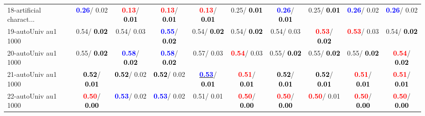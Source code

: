 \begin{table}[h]
\begin{center}
{\begin{tabular}{lc|c|c|c|c|c|c|c|c}
18-artificial charact... & \textcolor{blue}{\textbf{  0.26}}/  0.02 & \textcolor{red}{\textbf{  0.13}}/\textcolor{black}{\textbf{  0.01}} & \textcolor{red}{\textbf{  0.13}}/\textcolor{black}{\textbf{  0.01}} & \textcolor{red}{\textbf{  0.13}}/\textcolor{black}{\textbf{  0.01}} &   0.25/\textcolor{black}{\textbf{  0.01}} & \textcolor{blue}{\textbf{  0.26}}/\textcolor{black}{\textbf{  0.01}} &   0.25/\textcolor{black}{\textbf{  0.01}} & \textcolor{blue}{\textbf{  0.26}}/  0.02 & \textcolor{blue}{\textbf{  0.26}}/  0.02 \\
19-autoUniv au1 1000 &   0.54/\textcolor{black}{\textbf{  0.02}} &   0.54/  0.03 & \textcolor{blue}{\textbf{  0.55}}/\textcolor{black}{\textbf{  0.02}} &   0.54/\textcolor{black}{\textbf{  0.02}} &   0.54/\textcolor{black}{\textbf{  0.02}} &   0.54/  0.03 & \textcolor{red}{\textbf{  0.53}}/\textcolor{black}{\textbf{  0.02}} & \textcolor{red}{\textbf{  0.53}}/  0.03 &   0.54/\textcolor{black}{\textbf{  0.02}} \\
20-autoUniv au1 1000 &   0.55/\textcolor{black}{\textbf{  0.02}} & \textcolor{blue}{\textbf{  0.58}}/\textcolor{black}{\textbf{  0.02}} & \textcolor{blue}{\textbf{  0.58}}/\textcolor{black}{\textbf{  0.02}} &   0.57/  0.03 & \textcolor{red}{\textbf{  0.54}}/  0.03 &   0.55/\textcolor{black}{\textbf{  0.02}} &   0.55/\textcolor{black}{\textbf{  0.02}} &   0.55/\textcolor{black}{\textbf{  0.02}} & \textcolor{red}{\textbf{  0.54}}/\textcolor{black}{\textbf{  0.02}} \\
21-autoUniv au1 1000 & \textcolor{black}{\textbf{  0.52}}/\textcolor{black}{\textbf{  0.01}} & \textcolor{black}{\textbf{  0.52}}/  0.02 & \textcolor{black}{\textbf{  0.52}}/  0.02 & \underline{\textcolor{blue}{\textbf{  0.53}}}/\textcolor{black}{\textbf{  0.01}} & \textcolor{red}{\textbf{  0.51}}/\textcolor{black}{\textbf{  0.01}} & \textcolor{black}{\textbf{  0.52}}/\textcolor{black}{\textbf{  0.01}} & \textcolor{black}{\textbf{  0.52}}/\textcolor{black}{\textbf{  0.01}} & \textcolor{red}{\textbf{  0.51}}/\textcolor{black}{\textbf{  0.01}} & \textcolor{red}{\textbf{  0.51}}/\textcolor{black}{\textbf{  0.01}} \\ \hline
22-autoUniv au1 1000 & \textcolor{red}{\textbf{  0.50}}/\textcolor{black}{\textbf{  0.00}} & \textcolor{blue}{\textbf{  0.53}}/  0.02 & \textcolor{blue}{\textbf{  0.53}}/  0.02 &   0.51/  0.01 & \textcolor{red}{\textbf{  0.50}}/\textcolor{black}{\textbf{  0.00}} & \textcolor{red}{\textbf{  0.50}}/\textcolor{black}{\textbf{  0.00}} & \textcolor{red}{\textbf{  0.50}}/  0.01 & \textcolor{red}{\textbf{  0.50}}/\textcolor{black}{\textbf{  0.00}} & \textcolor{red}{\textbf{  0.50}}/\textcolor{black}{\textbf{  0.00}} \\

\end{tabular}}
\end{center}
\end{table}
